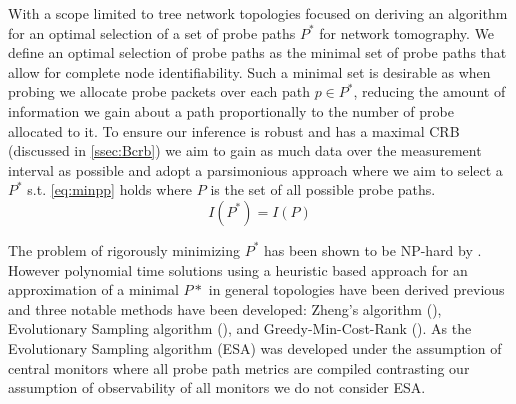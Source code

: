 With a scope limited to tree network topologies \cite{lawrence_network_2006} focused on deriving an algorithm for an optimal selection of a set of probe paths $P^*$ for network tomography. We define an optimal selection of probe paths as the minimal set of probe paths that allow for complete node identifiability. Such a minimal set is desirable as when probing we allocate probe packets over each path $p\in P^*$, reducing the amount of information we gain about a path proportionally to the number of probe allocated to it. To ensure our inference is robust and has a maximal CRB (discussed in \cref{ssec:Bcrb}) we aim to gain as much data over the measurement interval as possible and adopt a parsimonious approach where we aim to select a $P^*$ s.t. \cref{eq:minpp} holds where $P$ is the set of all possible probe paths.
\begin{equation}
\label{eq:minpp}
    I(P^*) = I(P)
\end{equation}
\par
The problem of rigorously minimizing $P^*$ has been shown to be NP-hard by \cite{zheng_minimizing_2013}. However polynomial time solutions using a heuristic based approach for an approximation of a minimal $P*$ in general topologies have been derived previous and three notable methods have been developed: Zheng's algorithm (\cite{zheng_minimizing_2013}), Evolutionary Sampling algorithm (\cite{rahali_unicast_2019}), and Greedy-Min-Cost-Rank (\cite{tootaghaj_parsimonious_2018}). As the Evolutionary Sampling algorithm (ESA) was developed under the assumption of central monitors where all probe path metrics are compiled contrasting our assumption of observability of all monitors we do not consider ESA.\par
\captionsetup{justification=centering}
